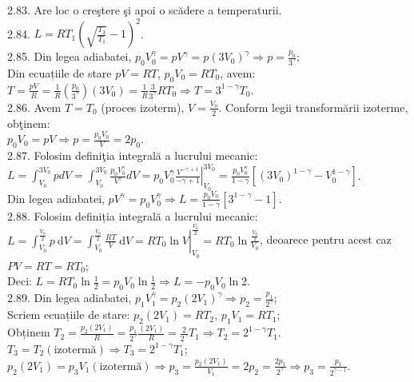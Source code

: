 2.83. Are loc o creştere şi apoi o scădere a temperaturii.\\

2.84. $L=R T_{1}\left(\sqrt{\frac{T_{3}}{T_{1}}}-1\right)^{2}$.\\

2.85. Din legea adiabatei, $p_{0} V_{0}^{\gamma}=p V^{\gamma}=p\left(3 V_{0}\right)^{\gamma} \Rightarrow p=\frac{p_{0}}{3^{\gamma}}$;\\ Din ecuațiile de stare $p V=R T$, $p_{0} V_{0}=R T_{0}$, avem:\\ $T=\frac{p V}{R}=\frac{1}{R}\left(\frac{p_{0}}{3^{\gamma}}\right)\left(3 V_{0}\right)=\frac{1}{R} \frac{3}{3^{\gamma}} R T_{0} \Rightarrow T=3^{1-\gamma} T_{0}$.\\

2.86. Avem $T=T_{0}$ (proces izoterm), $V=\frac{V_{0}}{2}$. Conform legii transformării izoterme, obţinem:\\ $p_{0} V_{0}=p V \Rightarrow p=\frac{p_{0} V_{0}}{V}=2 p_{0}$.\\

2.87. Folosim definiţia integrală a lucrului mecanic:\\ $L=\int_{V_{0}}^{3 V_{0}} p d V=\int_{V_{0}}^{3 V_{0}} \frac{p_{0} V_{0}^{\gamma}}{V^{\gamma}} d V=\left.p_{0} V_{0}^{\gamma} \frac{V^{-\gamma+1}}{-\gamma+1}\right|_{V_{0}} ^{3 V_{0}}=\frac{p_{0} V_{0}^{\gamma}}{1-\gamma}\left[\left(3 V_{0}\right)^{1-\gamma}-V_{0}^{1-\gamma}\right]$.\\ Din legea adiabatei, $p V^{\gamma}=p_{0} V_{0}^{\gamma} \Rightarrow L=\frac{p_{0} V_{0}}{1-\gamma}\left[3^{1-\gamma}-1\right]$.\\

2.88. Folosim definiția integrală a lucrului mecanic:\\ $L=\int_{V_{0}}^{\frac{V_{0}}{2}} p \mathrm{~d} V=\left.\int_{V_{0}}^{\frac{V_{0}}{2}} \frac{R T}{V} \mathrm{~d} V=R T_{0} \ln V\right|_{V_{0}} ^{\frac{V_{0}}{2}}=R T_{0} \ln \frac{\frac{V_{0}}{2}}{V_{0}}$, deoarece pentru acest caz $P V=R T=R T_{0}$;\\ Deci: $L=R T_{0} \ln \frac{1}{2}=p_{0} V_{0} \ln \frac{1}{2} \Rightarrow L=-p_{0} V_{0} \ln 2$.\\

2.89. Din legea adiabatei, $p_{1} V_{1}^{\gamma}=p_{2}\left(2 V_{1}\right)^{\gamma} \Rightarrow p_{2}=\frac{p_{1}}{2^{\gamma}}$;\\ Scriem ecuațiile de stare: $p_{2}\left(2 V_{1}\right)=R T_{2}$, $p_{1} V_{1}=R T_{1}$;\\ Obținem $T_{2}=\frac{p_{2}\left(2 V_{1}\right)}{R}=\frac{p_{1}}{2^{\gamma}} \frac{\left(2 V_{1}\right)}{R}=\frac{2}{2^{\gamma}} T_{1} \Rightarrow T_{2}=2^{1-\gamma} T_{1}$.\\ $T_{3}=T_{2}(\text {izotermă}) \Rightarrow T_{3}=2^{1-\gamma} T_{1}$;\\ $p_{2}\left(2 V_{1}\right)=p_{3} V_{1}(\text {izotermă}) \Rightarrow p_{3}=\frac{p_{2}\left(2 V_{1}\right)}{V_{1}}=2 p_{2}=\frac{2 p_{1}}{2^{\gamma}} \Rightarrow p_{3}=\frac{p_{1}}{2^{\gamma-1}}$.\\

